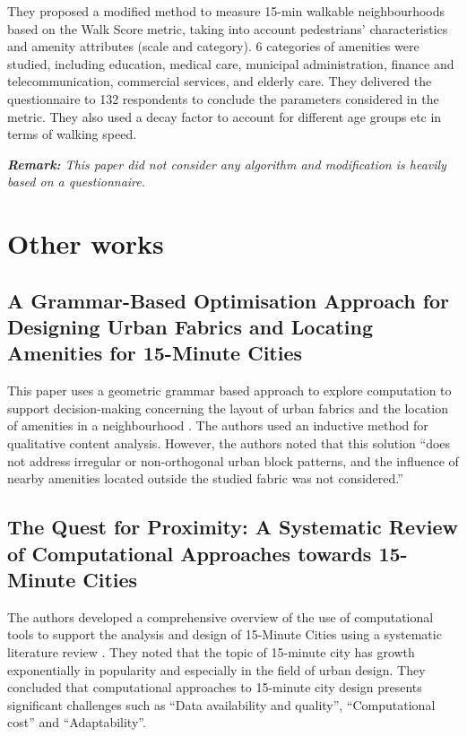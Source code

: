They proposed a modified method to measure 15-min walkable neighbourhoods based on the Walk Score metric, taking into account pedestrians' characteristics and amenity attributes (scale and category). 6 categories of amenities were studied, including education, medical care, municipal administration, finance and telecommunication, commercial services, and elderly care. They delivered the questionnaire to 132 respondents to conclude the parameters considered in the metric. They also used a decay factor to account for different age groups etc in terms of walking speed.

\textit{\textbf{Remark:} This paper did not consider any algorithm and modification is heavily based on a questionnaire.}

\section{Other works}

\subsection{A Grammar-Based Optimisation Approach for Designing Urban Fabrics and Locating Amenities for 15-Minute Cities}

This paper uses a geometric grammar based approach to explore computation to support decision-making concerning the layout of urban fabrics and the location of amenities in a neighbourhood \cite{lima_grammar-based_2022}. The authors used an inductive method for qualitative content analysis. However, the authors noted that this solution “does not address irregular or non-orthogonal urban block patterns, and the influence of nearby amenities located outside the studied fabric was not considered.”

\subsection{The Quest for Proximity: A Systematic Review of Computational Approaches towards 15-Minute Cities}

The authors developed a comprehensive overview of the use of computational tools to support the analysis and design of 15-Minute Cities using a systematic literature review \cite{lima_quest_2023}. They noted that the topic of 15-minute city has growth exponentially in popularity and especially in the field of urban design. They concluded that computational approaches to 15-minute city design presents significant challenges such as “Data availability and quality”, “Computational cost” and “Adaptability”.

